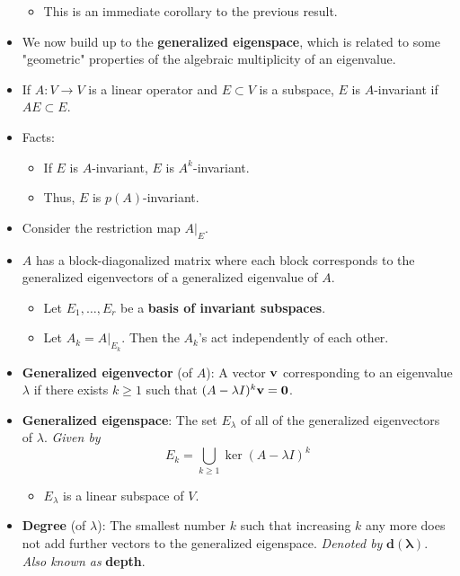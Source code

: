 \documentclass[../../notes.tex]{subfiles}
\begin{document}
\begin{itemize}
\begin{itemize}
        \item This is an immediate corollary to the previous result.
    \end{itemize}
    \item We now build up to the \textbf{generalized eigenspace}, which is related to some "geometric" properties of the algebraic multiplicity of an eigenvalue.
    \item If $A:V\to V$ is a linear operator and $E\subset V$ is a subspace, $E$ is $A$-invariant if $AE\subset E$.
    \item Facts:
    \begin{itemize}
        \item If $E$ is $A$-invariant, $E$ is $A^k$-invariant.
        \item Thus, $E$ is $p(A)$-invariant.
    \end{itemize}
    \item Consider the restriction map $A|_E$.
    \item $A$ has a block-diagonalized matrix where each block corresponds to the generalized eigenvectors of a generalized eigenvalue of $A$.
    \begin{itemize}
        \item Let $E_1,\dots,E_r$ be a \textbf{basis of invariant subspaces}.
        \item Let $A_k=A|_{E_k}$. Then the $A_k$'s act independently of each other.
    \end{itemize}
    \item \textbf{Generalized eigenvector} (of $A$): A vector $\mathbf{v}$ corresponding to an eigenvalue $\lambda$ if there exists $k\geq 1$ such that $(A-\lambda I)^k\mathbf{v}=\bm{0}$.
    \item \textbf{Generalized eigenspace}: The set $E_\lambda$ of all of the generalized eigenvectors of $\lambda$. \emph{Given by}
    \begin{equation*}
        E_k = \bigcup_{k\geq 1}\ker(A-\lambda I)^k
    \end{equation*}
    \begin{itemize}
        \item $E_\lambda$ is a linear subspace of $V$.
    \end{itemize}
    \item \textbf{Degree} (of $\lambda$): The smallest number $k$ such that increasing $k$ any more does not add further vectors to the generalized eigenspace. \emph{Denoted by} $\bm{d(\lambda)}$. \emph{Also known as} \textbf{depth}.
    \begin{itemize}

\end{itemize}
\end{itemize}
\end{document}
